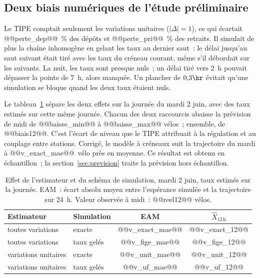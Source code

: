 \subsection{Deux biais numériques de l'étude préliminaire}\label{sec:biais}

Le TIPE comptait seulement les variations unitaires ($|\Delta|=1$), ce qui écartait @@perte_dep@@~\% des dépôts et @@perte_pri@@~\% des retraits. Il simulait de plus la chaîne inhomogène en gelant les taux au dernier saut~: le délai jusqu'au saut suivant était tiré avec les taux du créneau courant, même s'il débordait sur les suivants. La nuit, les taux sont presque nuls~; un délai tiré vers 2~h pouvait dépasser la pointe de 7~h, alors manquée. Un plancher de $0{,}3\hr$ évitait qu'une simulation se bloque quand les deux taux étaient nuls.

Le tableau~\ref{tab:variantes} sépare les deux effets sur la journée du mardi 2 juin, avec des taux estimés sur cette même journée. Chacun des deux raccourcis abaisse la prévision de midi de @@baisse_min@@ à @@baisse_max@@ vélos~; ensemble, de @@biais12@@. C'est l'\og écart de niveau\fg{} que le TIPE attribuait à la régulation et au couplage entre stations. Corrigé, le modèle à créneaux suit la trajectoire du mardi à @@v_exact_mae@@~vélo près en moyenne. Ce résultat est obtenu en échantillon~; la section~\ref{sec:prevision} traite la prévision hors échantillon.

\begin{table}[t]
\centering\small
\caption{Effet de l'estimateur et du schéma de simulation, mardi 2 juin, taux estimés sur la journée. EAM~: écart absolu moyen entre l'espérance simulée et la trajectoire sur 24~h. Valeur observée à midi~: @@reel12@@ vélos.}\label{tab:variantes}
\begin{tabular}{@{}llcc@{}}
\toprule
Estimateur & Simulation & EAM & $\hat X_{12\,\mathrm{h}}$\\
\midrule
toutes variations & exacte & @@v_exact_mae@@ & @@v_exact_12@@\\
toutes variations & taux gelés & @@v_fige_mae@@ & @@v_fige_12@@\\
variations unitaires & exacte & @@v_unit_mae@@ & @@v_unit_12@@\\
variations unitaires & taux gelés & @@v_uf_mae@@ & @@v_uf_12@@\\
\bottomrule
\end{tabular}
\end{table}
